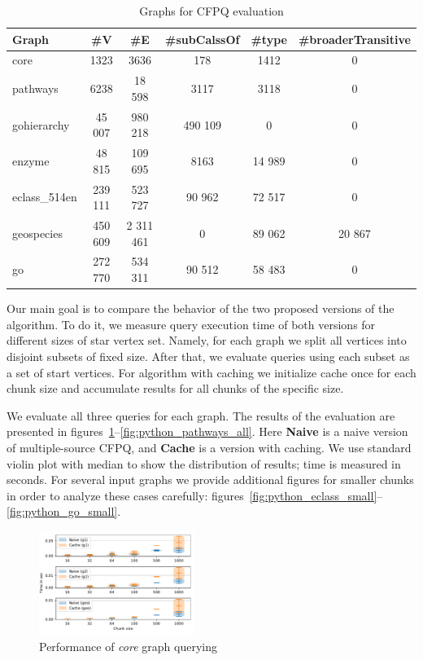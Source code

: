 {\setlength{\tabcolsep}{0.1em}
\begin{table}
{
\caption{Graphs for CFPQ evaluation}
\label{tbl:graphs_for_cfpq}
\small
{}
\begin{tabular}{|l|c|c|c|c|c|}
\hline
Graph          & \#V       & \#E        & \#subCalssOf & \#type &\#broaderTransitive\\
\hline
\hline
core                        & 1323     & 3636       & 178       & 1412     & 0      \\
pathways                    & 6238     & 18 598     & 3117      & 3118     & 0      \\
gohierarchy                 & 45 007   & 980 218    & 490 109   & 0        & 0      \\
enzyme                      & 48 815   & 109 695    & 8163      & 14 989   & 0      \\
eclass\_514en               & 239 111  & 523 727    & 90 962    & 72 517   & 0      \\
geospecies                  & 450 609  & 2 311 461  & 0         & 89 062   & 20 867 \\
go                          & 272 770  & 534 311    & 90 512    & 58 483   & 0      \\
\hline
\end{tabular}
}
\end{table}
}


Our main goal is to compare the behavior of the two proposed versions of the algorithm.
To do it, we measure query execution time of both versions for different sizes of star vertex set.
Namely, for each graph we split all vertices into disjoint subsets of fixed size.
After that, we evaluate queries using each subset as a set of start vertices.
For algorithm with caching we initialize cache once for each chunk size and accumulate results for all chunks of the specific size.

We evaluate all three queries for each graph.
The results of the evaluation are presented in figures~\ref{fig:python_core_all}--\ref{fig:python_pathways_all}.
Here \textbf{Naive} is a naive version of multiple-source CFPQ, and \textbf{Cache} is a version with caching.  
We use standard violin plot with median to show the distribution of results; time is measured in seconds.
For several input graphs we provide additional figures for smaller chunks in order to analyze these cases carefully: figures~\ref{fig:python_eclass_small}--\ref{fig:python_go_small}.

\begin{figure}[h]
\centering
\includegraphics[width=0.45\textwidth]{data/raw/core.pdf}
\caption{Performance of \textit{core} graph querying}
\label{fig:python_core_all}
\end{figure}

